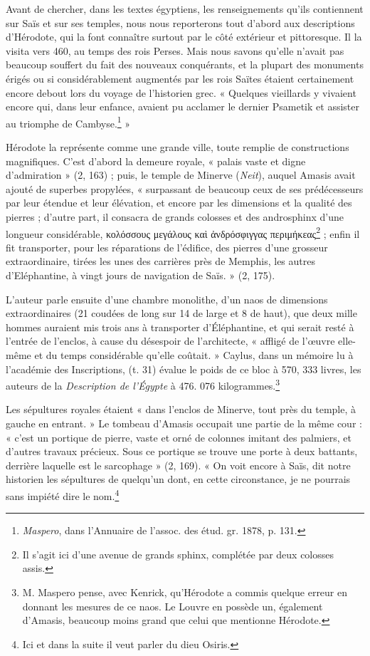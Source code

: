 \documentclass[letterpaper,twocolumn,openany,nodeprecatedcode]{dndbook}
\begin{document}
Avant de chercher, dans les textes égyptiens, les renseignements qu'ils contiennent sur Saïs et sur ses temples, nous nous reporterons tout d'abord aux descriptions d'Hérodote, qui la font connaître surtout par le côté extérieur et pittoresque. Il la visita vers 460, au temps des rois Perses. Mais nous savons qu'elle n'avait pas beaucoup souffert du fait des nouveaux conquérants, et la plupart des monuments érigés ou si considérablement augmentés par les rois Saïtes étaient certainement encore debout lors du voyage de l'historien grec. « Quelques vieillards y vivaient encore qui, dans leur enfance, avaient pu acclamer le dernier Psametik et assister au triomphe de Cambyse.\footnote{\emph{Maspero}, dans l'Annuaire de l'assoc. des étud. gr. 1878, p. 131.} »

Hérodote la représente comme une grande ville, toute remplie de constructions magnifiques. C'est d'abord la demeure royale, « palais vaste et digne d'admiration » (2, 163) ; puis, le temple de Minerve (\emph{Neit}), auquel Amasis avait ajouté de superbes propylées, « surpassant de beaucoup ceux de ses prédécesseurs par leur étendue et leur élévation, et encore par les dimensions et la qualité des pierres ; d'autre part, il consacra de grands colosses et des androsphinx d'une longueur considérable, κολόσσους μεγάλους καὶ ἀνδρόσφιγγας περιμήκεας\footnote{Il s'agit ici d'une avenue de grands sphinx, complétée par deux colosses assis.} ; enfin il fit transporter, pour les réparations de l'édifice, des pierres d'une grosseur extraordinaire, tirées les unes des carrières près de Memphis, les autres d'Eléphantine, à vingt jours de navigation de Saïs. » (2, 175).

L'auteur parle ensuite d'une chambre monolithe, d'un naos de dimensions extraordinaires (21 coudées de long sur 14 de large et 8 de haut), que deux mille hommes auraient mis trois ans à transporter d'Éléphantine, et qui serait resté à l'entrée de l'enclos, à cause du désespoir de l'architecte, « affligé de l'œuvre elle-même et du temps considérable qu'elle coûtait. » Caylus, dans un mémoire lu à l'académie des Inscriptions, (t. 31) évalue le poids de ce bloc à 570, 333 livres, les auteurs de la \emph{Description de l'Égypte} à 476. 076 kilogrammes.\footnote{M. Maspero pense, avec Kenrick, qu'Hérodote a commis quelque erreur en donnant les mesures de ce naos. Le Louvre en possède un, également d'Amasis, beaucoup moins grand que celui que mentionne Hérodote.}

Les sépultures royales étaient « dans l'enclos de Minerve, tout près du temple, à gauche en entrant. » Le tombeau d'Amasis occupait une partie de la même cour : « c'est un portique de pierre, vaste et orné de colonnes imitant des palmiers, et d'autres travaux précieux. Sous ce portique se trouve une porte à deux battants, derrière laquelle est le sarcophage » (2, 169). « On voit encore à Saïs, dit notre historien les sépultures de quelqu'un dont, en cette circonstance, je ne pourrais sans impiété dire le nom.\footnote{Ici et dans la suite il veut parler du dieu Osiris.}
\end{document}
